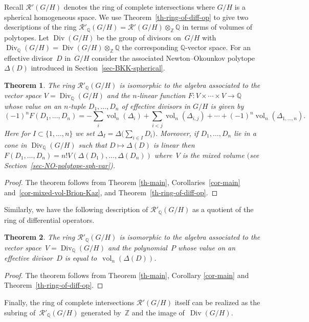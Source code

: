 \documentclass[10pt,a4paper]{amsart}
\def \Z{\mathbb{Z}}
\def \Q{\mathbb{Q}}
\def \Div{\operatorname{Div}}
\def \vol{\operatorname{vol}}
\numberwithin{equation}{section}
\newtheorem{Th}{Theorem}[section]
\theoremstyle{definition}
\begin{document}
Recall $\mathcal{R}'(G/H)$ denotes the ring of complete intersections where $G/H$ is a spherical homogeneous space. We use Theorem~\ref{th-ring-of-diff-op} to give two descriptions of the ring $\mathcal{R}'_\Q(G/H) = \mathcal{R}'(G/H) \otimes_{\Z} \Q$ in terms of volumes of polytopes. Let $\Div(G/H)$ be the group of divisors on~$G/H$ with $\Div_\Q(G/H) = \Div(G/H) \otimes_\Z \Q$ the corresponding $\Q$-vector space. For an effective divisor~$D$ in~$G/H$ consider the associated Newton--Okounkov polytope~$\Delta(D)$ introduced in Section~\ref{sec-BKK-spherical}.

\begin{Th}The ring $\mathcal{R}'_\Q(G/H)$ is isomorphic to the algebra associated to the vector space $V = \Div_\Q(G/H)$ and the $n$-linear function $F\colon V \times \cdots \times V \to \Q$ whose value on an $n$-tuple $D_1, \ldots, D_n$ of effective divisors in $G/H$ is given by
$$(-1)^n F(D_1, \ldots, D_n) = - \sum_{i} \vol_n(\Delta_i) + \sum_{i < j} \vol_n(\Delta_{i,j}) + \cdots
+ (-1)^n \vol_n(\Delta_{1, \ldots, n}).$$ Here for $I \subset \{1, \ldots, n\}$ we set $\Delta_I =\Delta\big(\sum_{i \in I} D_i\big)$. Moreover, if $D_1, \ldots, D_n$ lie in a cone in $\Div_\Q(G/H)$ such that $D \mapsto \Delta(D)$ is linear then $F(D_1, \ldots, D_n) = n! V(\Delta(D_1), \ldots, \Delta(D_n))$ where~$V$ is the mixed volume $($see Section~{\rm \ref{sec-NO-polytope-sph-var})}.
\end{Th}
\begin{proof}The theorem follows from Theorem \ref{th-main}, Corollaries~\ref{cor-main} and~\ref{cor-mixed-vol-Brion-Kaz}, and Theo\-rem~\ref{th-ring-of-diff-op}.
\end{proof}

Similarly, we have the following description of $\mathcal{R}'_\Q(G/H)$ as a quotient of the ring of dif\-fe\-rential operators.

\begin{Th} \label{th-ring-complete-intersec-vol-poly}
The ring $\mathcal{R}'_\Q(G/H)$ is isomorphic to the algebra associated to the vector spa\-ce~$V = \Div_\Q(G/H)$ and the polynomial~$P$ whose value on an effective divisor~$D$ is equal to~$\vol_n(\Delta(D))$.
\end{Th}
\begin{proof}The theorem follows from Theorem \ref{th-main}, Corollary \ref{cor-main} and Theorem~\ref{th-ring-of-diff-op}.
\end{proof}

Finally, the ring of complete intersections $\mathcal{R}'(G/H)$ itself can be realized as the subring of~$\mathcal{R}'_\Q(G/H)$ generated by~$\Z$ and the image of~$\Div(G/H)$.
\end{document}
